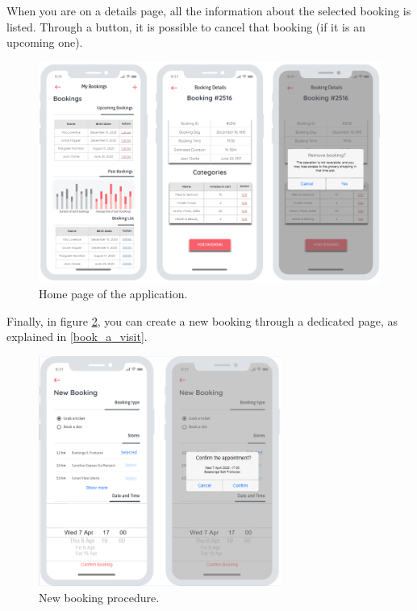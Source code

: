 \documentclass[table, 12pt]{article}
\begin{document}
When you are on a details page, all the information about the selected booking is listed. Through a button, it is possible to cancel that booking (if it is an upcoming one).

\begin{figure}[H]
    \begin{center}
        \includegraphics[width=\textwidth]{assets/mock_bookings.png}
        \caption{Home page of the application.}
        \label{mock_bookings}
    \end{center}
\end{figure}

Finally, in figure \ref{mock_new_booking}, you can create a new booking through a dedicated page, as explained in \ref{book_a_visit}.\\

\begin{figure}[H]
    \begin{center}
        \includegraphics[width=225pt]{assets/mock_new_booking.png}
        \caption{New booking procedure.}
        \label{mock_new_booking}
    \end{center}
\end{figure}
\end{document}

